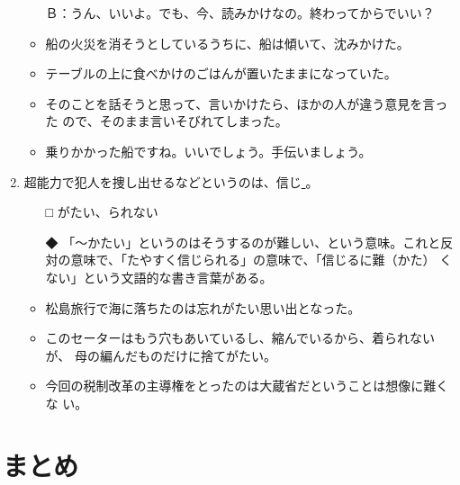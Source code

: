 \documentclass[
uplatex,
b5paper,
10pt,
dvipdfmx
]{jsbook}
\newif\ifEnglish
\newif\ifCHSummary
\begin{document}
\begin{enumerate}
\begin{itemize}
      Ｂ：うん、いいよ。でも、今、読みかけなの。終わってからでいい？

\item 船の火災を消そうとしているうちに、船は傾いて、沈みかけた。
\item テーブルの上に食べかけのごはんが置いたままになっていた。
\item そのことを話そうと思って、言いかけたら、ほかの人が違う意見を言った
      ので、そのまま言いそびれてしまった。
\item 乗りかかった船ですね。いいでしょう。手伝いましょう。
\end{itemize}

\item 超能力で犯人を捜し出せるなどというのは、信じ\underline{   }。
\begin{itemize}
\item[□] がたい、られない
\item[◆] 「〜かたい」というのはそうするのが難しい、という意味。これと反
	  対の意味で、「たやすく信じられる」の意味で、「信じるに難（かた）
	  くない」という文語的な書き言葉がある。
\end{itemize}
\begin{itemize}
\item 松島旅行で海に落ちたのは忘れがたい思い出となった。
\item このセーターはもう穴もあいているし、縮んでいるから、着られないが、
      母の編んだものだけに捨てがたい。
\item 今回の税制改革の主導権をとったのは大蔵省だということは想像に難くな
      い。
\end{itemize}
\end{enumerate}

\ifCHSummary
\ifEnglish
\chapter{Summary}
\else
\chapter{まとめ}
\fi
\fi

\appendix
 
\end{document}
